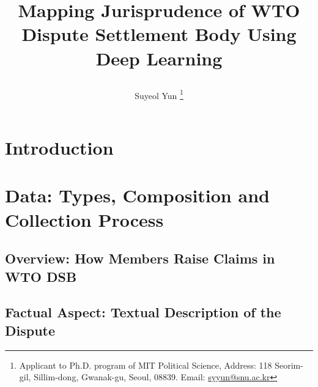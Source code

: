 \documentclass[12pt,letterpaper]{article}
\newcommand{\tit}{
\bf 
Mapping Jurisprudence of WTO Dispute Settlement Body Using Deep Learning
}
\newcommand\spacingset[1]{\renewcommand{\baselinestretch}
{#1}\small\normalsize}
\begin{document}
\spacingset{1.25}

\setcounter{page}{0}
\vspace{-.1in}

{\title{
    \tit
  }
  \author{Suyeol Yun
  \thanks{Applicant to Ph.D. program of MIT Political Science,
  Address: 118 Seorim-gil, Sillim-dong, Gwanak-gu, Seoul,
  08839. Email: \href{mailto:syyun@snu.ac.kr}{syyun@snu.ac.kr}
  }
  }
  \maketitle
}

\thispagestyle{empty}
\vspace{-.1in}

\begin{abstract}
  
\end{abstract}

\spacingset{1.5} %

\clearpage

\section{Introduction}










\section{Data: Types, Composition and Collection Process} \label{sec:data}


\subsection{Overview: How Members Raise Claims in WTO DSB}


\subsection{Factual Aspect: Textual Description of the Dispute}

\end{document}
